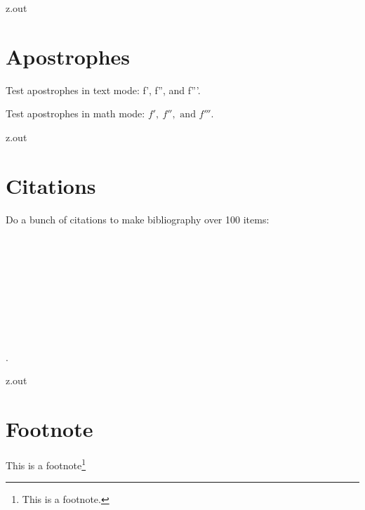 \MyIO
  

\begin{VerbatimOut}{z.out}


\section{Apostrophes}

Test apostrophes in text mode: f', f'', and f'''.

Test apostrophes in math mode: \(f',\ f'',\text{ and }f'''\).
\end{VerbatimOut}

\MyIO


\begin{VerbatimOut}{z.out}


\section{Citations}

Do a bunch of citations to make bibliography over 100 items:\\
\cite{t001,t002,t003,t004,t005,t006,t007,t008,t009,t010}\\
\cite{t011,t012,t013,t014,t015,t016,t017,t018,t019,t020}\\
\cite{t021,t022,t023,t024,t025,t026,t027,t028,t029,t030}\\
\cite{t031,t032,t033,t034,t035,t036,t037,t038,t039,t040}\\
\cite{t041,t042,t043,t044,t045,t046,t047,t048,t049,t050}\\
\cite{t051,t052,t053,t054,t055,t056,t057,t058,t059,t060}\\
\cite{t061,t062,t063,t064,t065,t066,t067,t068,t069,t070}\\
\cite{t071,t072,t073,t074,t075,t076,t077,t078,t079,t080}\\
\cite{t081,t082,t083,t084,t085,t086,t087,t088,t089,t090}\\
\cite{t091,t092,t093,t094,t095,t096,t097,t098,t099,t100}.
\end{VerbatimOut}

\MyIO


\begin{VerbatimOut}{z.out}


\section{Footnote}

This is a footnote\footnote{This is a footnote.}%
\index{\verb+\footnote+}%
\end{VerbatimOut}

